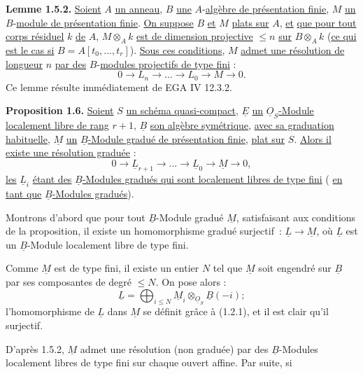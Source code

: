 
\textbf{Lemme 1.5.2.} \uline{Soient} \(A\) \uline{un anneau}, \(B\) \uline{une} \(A\)-\uline{algèbre de présentation finie}, \(M\) \uline{un} \(B\)-\uline{module de présentation finie}. \uline{On suppose} \(B\) \uline{et} \(M\) \uline{plats sur} \(A\), \uline{et} \uline{que pour tout corps résiduel} \(k\) \uline{de} \(A\), \(M\otimes_A k\) \uline{est de dimension projective} \(\leq n\) \uline{sur} \(B\otimes_A k\) (\uline{ce qui est le cas si} \(B=A[t_0,\ldots,t_r]\)). \uline{Sous ces conditions}, \(M\) \uline{admet une résolution de longueur} \(n\) \uline{par des} \(B\)-\uline{modules projectifs de type fini} :
\[
  0\longrightarrow L_n\longrightarrow\ldots\longrightarrow L_0\longrightarrow M\longrightarrow 0.
\]
Ce lemme résulte immédiatement de EGA IV 12.3.2.

\textbf{Proposition 1.6.} \uline{Soient} \(S\) \uline{un schéma quasi-compact}, \(\underline{E}\) \uline{un} \(\underline{O}_S\)\uline{-Module localement libre de rang} \(r+1\), \(\underline{B}\) \uline{son algèbre symétrique}, \uline{avec sa graduation habituelle}, \(\underline{M}\) \uline{un} \(\underline{B}\)\uline{-Module gradué de présentation finie}, \uline{plat sur} \(S\). \uline{Alors il existe une résolution graduée} :
\[
  0\longrightarrow \underline{L}_{r+1}\longrightarrow\ldots\longrightarrow \underline{L}_0\longrightarrow \underline{M}\longrightarrow 0,
\]
\uline{les} \(\underline{L}_i\) \uline{étant des} \(\underline{B}\)\uline{-Modules gradués qui sont localement libres de type fini} ( \uline{en tant que} \(\underline{B}\)\uline{-Modules gradués}).

Montrons d'abord que pour tout \(\underline{B}\)-Module gradué \(\underline{M}\), satisfaisant aux conditions de la proposition, il existe un homomorphisme gradué surjectif~: \(\underline{L}\to \underline{M}\), où \(\underline{L}\) est un \(\underline{B}\)-Module localement libre de type fini.

Comme \(\underline{M}\) est de type fini, il existe un entier \(N\) tel que \(\underline{M}\) soit engendré sur \(\underline{B}\) par ses composantes de degré \(\leq N\). On pose alors :
\[
  \underline{L}=\bigoplus_{i\leq N} \underline{M}_i\otimes_{\underline{O}_S}\underline{B}(-i);
\]
l'homomorphisme de \(\underline{L}\) dans \(\underline{M}\) se définit grâce à (1.2.1), et il est clair qu'il surjectif.

D'après 1.5.2, \(\underline{M}\) admet une résolution (non graduée) par des \(\underline{B}\)-Modules localement libres de type fini sur chaque ouvert affine. Par suite, si 
